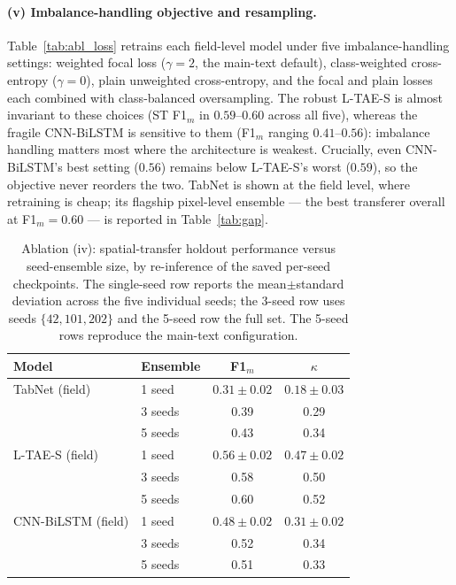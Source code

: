 \documentclass[pdflatex,sn-mathphys]{sn-jnl} %
\begin{document}
\paragraph{(v) Imbalance-handling objective and resampling.}
Table~\ref{tab:abl_loss} retrains each field-level model under five
imbalance-handling settings: weighted focal loss ($\gamma=2$, the main-text
default), class-weighted cross-entropy ($\gamma=0$), plain unweighted
cross-entropy, and the focal and plain losses each combined with class-balanced
oversampling. The robust L-TAE-S is almost invariant to these choices (ST F1$_m$
in $0.59$--$0.60$ across all five), whereas the fragile CNN-BiLSTM is sensitive to
them (F1$_m$ ranging $0.41$--$0.56$): imbalance handling matters most where the
architecture is weakest. Crucially, even CNN-BiLSTM's best setting ($0.56$)
remains below L-TAE-S's worst ($0.59$), so the objective never reorders the two.
TabNet is shown at the field level, where retraining is cheap; its flagship
pixel-level ensemble --- the best transferer overall at F1$_m=0.60$ --- is
reported in Table~\ref{tab:gap}.

\begin{table}[htbp]
\centering
\scriptsize
\caption{Ablation (iv): spatial-transfer holdout performance versus
seed-ensemble size, by re-inference of the saved per-seed checkpoints. The
single-seed row reports the mean$\pm$standard deviation across the five individual
seeds; the 3-seed row uses seeds $\{42,101,202\}$ and the 5-seed row the full set.
The 5-seed rows reproduce the main-text configuration.}
\label{tab:abl_ensemble}
\renewcommand{\arraystretch}{1.12}
\setlength{\tabcolsep}{8pt}
\begin{tabular}{llcc}
\toprule
\textbf{Model} & \textbf{Ensemble} & \textbf{F1$_m$} & \textbf{$\kappa$} \\
\midrule
TabNet (field)     & 1 seed  & $0.31\pm0.02$ & $0.18\pm0.03$ \\
                   & 3 seeds & 0.39 & 0.29 \\
                   & 5 seeds & 0.43 & 0.34 \\
\midrule
L-TAE-S (field)    & 1 seed  & $0.56\pm0.02$ & $0.47\pm0.02$ \\
                   & 3 seeds & 0.58 & 0.50 \\
                   & 5 seeds & 0.60 & 0.52 \\
\midrule
CNN-BiLSTM (field) & 1 seed  & $0.48\pm0.02$ & $0.31\pm0.02$ \\
                   & 3 seeds & 0.52 & 0.34 \\
                   & 5 seeds & 0.51 & 0.33 \\
\bottomrule
\end{tabular}
\end{table}
\end{document}
